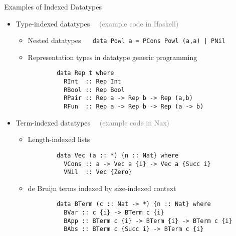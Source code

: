 \documentclass[final]{beamer}
\begin{document}
\begin{frame}[fragile]
\begin{columns}[t]
\begin{column}{.315\linewidth}
\begin{block}{Examples of Indexed Datatypes}
\begin{itemize}
\item Type-indexed datatypes
	$\quad$\textcolor{gray}{\normalsize(example code in Haskell)}
	\begin{itemize}
		\item Nested datatypes $\quad$
			\lstinline!data Powl a = PCons Powl (a,a) | PNil!
		\item Representation types in datatype generic programming
		\begin{lstlisting}
		data Rep t where
		  RInt  :: Rep Int
		  RBool :: Rep Bool
		  RPair :: Rep a -> Rep b -> Rep (a,b)
		  RFun  :: Rep a -> Rep b -> Rep (a -> b)
		\end{lstlisting}
	\end{itemize}
\item Term-indexed datatypes
	$\quad$\textcolor{gray}{\normalsize(example code in Nax)}
	\begin{itemize}
        	\item Length-indexed lists
		\begin{lstlisting}
		data Vec (a :: *) {n :: Nat} where
		  VCons :: a -> Vec a {i} -> Vec a {Succ i}
		  VNil  :: Vec {Zero}
		\end{lstlisting}
		\item de Bruijn terms indexed by size-indexed context
		\begin{lstlisting}
		data BTerm (c :: Nat -> *) {n :: Nat} where
		  BVar :: c {i} -> BTerm c {i}
		  BApp :: BTerm c {i} -> BTerm {i} -> BTerm c {i}
		  BAbs :: BTerm c {Succ i} -> BTerm c {i}
		\end{lstlisting}
	\end{itemize}
\end{itemize} %
\end{block}

\end{column}
\begin{column}{.315\linewidth}


\end{column}
\end{columns}
\end{frame}
\end{document}
